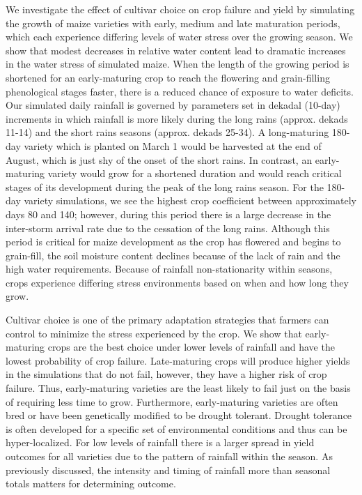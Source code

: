 We investigate the effect of cultivar choice on crop failure and yield by simulating the growth of maize varieties with early, medium and late maturation periods, which each experience differing levels of water stress over the growing season. We show that modest decreases in relative water content lead to dramatic increases in the water stress of simulated maize. When the length of the growing period is shortened for an early-maturing crop to reach the flowering and grain-filling phenological stages faster, there is a reduced chance of exposure to water deficits. Our simulated daily rainfall is governed by parameters set in dekadal (10-day) increments in which rainfall is more likely during the long rains (approx. dekads 11-14) and the short rains seasons (approx. dekads 25-34). A long-maturing 180-day variety which is planted on March 1 would be harvested at the end of August, which is just shy of the onset of the short rains. In contrast, an early-maturing variety would grow for a shortened duration and would reach critical stages of its development during the peak of the long rains season. For the 180-day variety simulations, we see the highest crop coefficient between approximately days 80 and 140; however, during this period there is a large decrease in the inter-storm arrival rate due to the cessation of the long rains. Although this period is critical for maize development as the crop has flowered and begins to grain-fill, the soil moisture content declines because of the lack of rain and the high water requirements. Because of rainfall non-stationarity within seasons, crops experience differing stress environments based on when and how long they grow. 

Cultivar choice is one of the primary adaptation strategies that farmers can control to minimize the stress experienced by the crop. We show that early-maturing crops are the best choice under lower levels of rainfall and have the lowest probability of crop failure. Late-maturing crops will produce higher yields in the simulations that do not fail, however, they have a higher risk of crop failure. Thus, early-maturing varieties are the least likely to fail just on the basis of requiring less time to grow. Furthermore, early-maturing varieties are often bred or have been genetically modified to be drought tolerant. Drought tolerance is often developed for a specific set of environmental conditions and thus can be hyper-localized. For low levels of rainfall there is a larger spread in yield outcomes for all varieties due to the pattern of rainfall within the season. As previously discussed, the intensity and timing of rainfall more than seasonal totals matters for determining outcome.

